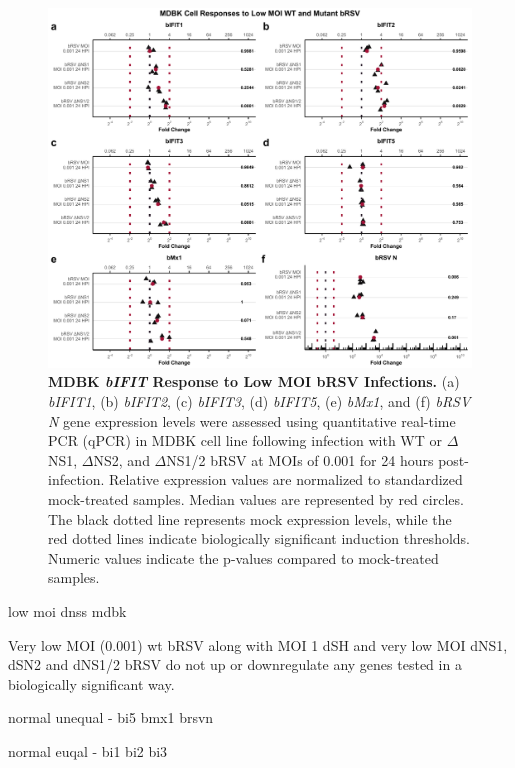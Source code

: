 \begin{figure}
    \centering
    \includegraphics[width=1\linewidth]{07. Chapter 2/Figs/02. Induction/06. mdbk_brsv_low_moi.pdf}
    \caption[MDBK \textit{bIFIT} Response to Low MOI bRSV Infections.]{\textbf{MDBK \textit{bIFIT} Response to Low MOI bRSV Infections.} (a) \textit{bIFIT1}, (b) \textit{bIFIT2}, (c) \textit{bIFIT3}, (d) \textit{bIFIT5}, (e) \textit{bMx1}, and (f) \textit{bRSV N} gene expression levels were assessed using quantitative real-time PCR (qPCR) in MDBK cell line following infection with WT or \(\Delta\)NS1, \(\Delta\)NS2, and \(\Delta\)NS1/2 bRSV at MOIs of 0.001 for 24 hours post-infection. Relative expression values are normalized to standardized mock-treated samples. Median values are represented by red circles. The black dotted line represents mock expression levels, while the red dotted lines indicate biologically significant induction thresholds. Numeric values indicate the p-values compared to mock-treated samples.}
    \label{fig:MDBK responses to low MOI mutant bRSV}
\end{figure}

low moi dnss mdbk

Very low MOI (0.001) wt bRSV along with MOI 1 dSH and very low MOI dNS1, dSN2 and dNS1/2 bRSV do not up or downregulate any genes tested in a biologically significant way.

normal unequal - bi5 bmx1 brsvn

normal euqal - bi1 bi2 bi3 

